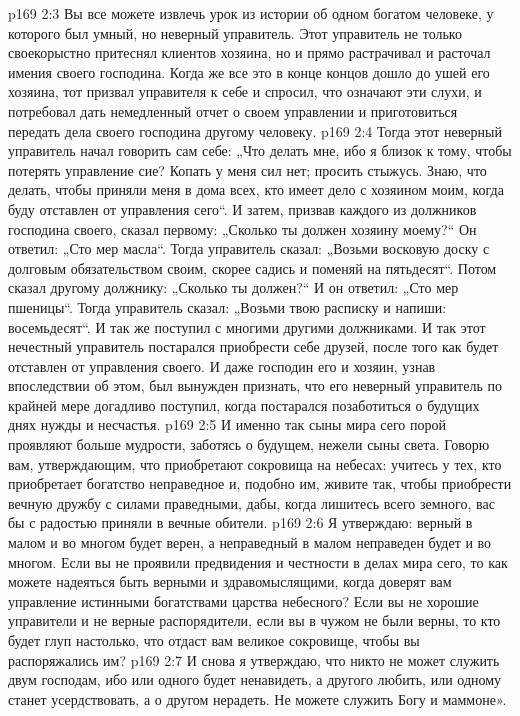 \vs p169 2:3 Вы все можете извлечь урок из истории об одном богатом человеке, у которого был умный, но неверный управитель. Этот управитель не только своекорыстно притеснял клиентов хозяина, но и прямо растрачивал и расточал имения своего господина. Когда же все это в конце концов дошло до ушей его хозяина, тот призвал управителя к себе и спросил, что означают эти слухи, и потребовал дать немедленный отчет о своем управлении и приготовиться передать дела своего господина другому человеку.
\vs p169 2:4 Тогда этот неверный управитель начал говорить сам себе: „Что делать мне, ибо я близок к тому, чтобы потерять управление сие? Копать у меня сил нет; просить стыжусь. Знаю, что делать, чтобы приняли меня в дома всех, кто имеет дело с хозяином моим, когда буду отставлен от управления сего“. И затем, призвав каждого из должников господина своего, сказал первому: „Сколько ты должен хозяину моему?“ Он ответил: „Сто мер масла“. Тогда управитель сказал: „Возьми восковую доску с долговым обязательством своим, скорее садись и поменяй на пятьдесят“. Потом сказал другому должнику: „Сколько ты должен?“ И он ответил: „Сто мер пшеницы“. Тогда управитель сказал: „Возьми твою расписку и напиши: восемьдесят“. И так же поступил с многими другими должниками. И так этот нечестный управитель постарался приобрести себе друзей, после того как будет отставлен от управления своего. И даже господин его и хозяин, узнав впоследствии об этом, был вынужден признать, что его неверный управитель по крайней мере догадливо поступил, когда постарался позаботиться о будущих днях нужды и несчастья.
\vs p169 2:5 И именно так сыны мира сего порой проявляют больше мудрости, заботясь о будущем, нежели сыны света. Говорю вам, утверждающим, что приобретают сокровища на небесах: учитесь у тех, кто приобретает богатство неправедное и, подобно им, живите так, чтобы приобрести вечную дружбу с силами праведными, дабы, когда лишитесь всего земного, вас бы с радостью приняли в вечные обители.
\vs p169 2:6 Я утверждаю: верный в малом и во многом будет верен, а неправедный в малом неправеден будет и во многом. Если вы не проявили предвидения и честности в делах мира сего, то как можете надеяться быть верными и здравомыслящими, когда доверят вам управление истинными богатствами царства небесного? Если вы не хорошие управители и не верные распорядители, если вы в чужом не были верны, то кто будет глуп настолько, что отдаст вам великое сокровище, чтобы вы распоряжались им?
\vs p169 2:7 И снова я утверждаю, что никто не может служить двум господам, ибо или одного будет ненавидеть, а другого любить, или одному станет усердствовать, а о другом нерадеть. Не можете служить Богу и маммоне».
